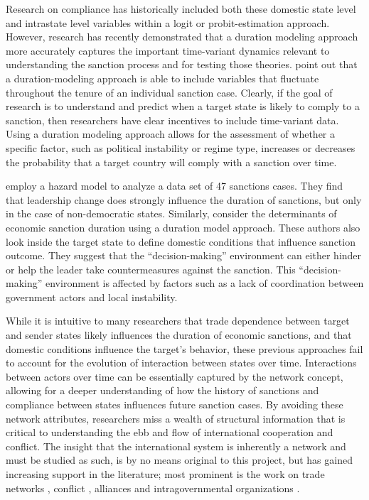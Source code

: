 Research on compliance has historically included both these domestic state level and intrastate level variables within a logit or probit-estimation approach. However, research has recently demonstrated that a duration modeling approach more accurately captures the important time-variant dynamics relevant to understanding the sanction process and for testing those theories. \cite{bolks2000} point out that a duration-modeling approach is able to include variables that fluctuate throughout the tenure of an individual sanction case. Clearly, if the goal of research is to understand and predict when a target state is likely to comply to a sanction, then researchers have clear incentives to include time-variant data. Using a duration modeling approach allows for the assessment of whether a specific factor, such as political instability or regime type, increases or decreases the probability that a target country will comply with a sanction over time.

\cite{mcgillivray2004} employ a hazard model to analyze a data set of 47 sanctions cases. They find that leadership change does strongly influence the duration of sanctions, but only in the case of non-democratic states. Similarly, \cite{bolks2000} consider the determinants of economic sanction duration using a duration model approach. These authors also look inside the target state to define domestic conditions that influence sanction outcome. They suggest that the ``decision-making'' environment can either hinder or help the leader take countermeasures against the sanction. This ``decision-making'' environment is affected by factors such as a lack of coordination between government actors and local instability. 


While it is intuitive to many researchers that trade dependence between target and sender states likely influences the duration of economic sanctions, and that domestic conditions influence the target's behavior, these previous approaches fail to account for the evolution of interaction between states over time. Interactions between actors over time can be essentially captured by the network concept, allowing for a deeper understanding of how the history of sanctions and compliance between states influences future sanction cases. By avoiding these network attributes, researchers miss a wealth of structural information that is critical to understanding the ebb and flow of international cooperation and conflict. The insight that the international system is inherently a network and must be studied as such, is by no means original to this project, but has gained increasing support in the literature; most prominent is the work on trade networks \citep{hoff2004modeling, ward:rainbow:2013}, conflict \citep{dorff2013}, alliances \citep{warren2010geometry} and intragovernmental organizations \citep{cao2009networks,greenhill2010norm}. 

